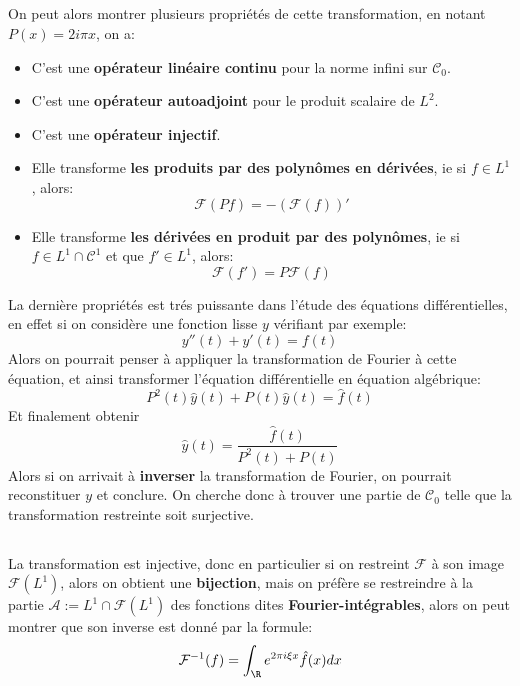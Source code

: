 \subsection*{}
On peut alors montrer plusieurs propriétés de cette transformation, en notant \( P(x) =  2i\pi x\), on a:
\begin{itemize}
   \item C'est une \textbf{opérateur linéaire continu} pour la norme infini sur \(  \mathcal{C}_0 \).
   \item C'est une \textbf{opérateur autoadjoint} pour le produit scalaire de \( L^2 \).
   \item C'est une \textbf{opérateur injectif}.
   \item Elle transforme \textbf{les produits par des polynômes en dérivées}, ie si \( f \in L^1\), alors:
   \[ 
      \mathcal{F}(Pf) = -(\mathcal{F}(f))'
   \]
   \item Elle transforme \textbf{les dérivées en produit par des polynômes}, ie si \( f \in L^1 \cap \mathcal{C}^1 \) et que \( f' \in L^1 \), alors:
   \[ 
      \mathcal{F}(f') = P\mathcal{F}(f) 
   \]
\end{itemize}
La dernière propriétés est trés puissante dans l'étude des équations différentielles, en effet si on considère une fonction lisse \( y \) vérifiant par exemple:
\[ 
   y''(t) + y'(t) =  f(t)
\]
Alors on pourrait penser à appliquer la transformation de Fourier à cette équation, et ainsi transformer l'équation différentielle en équation algébrique:
\[ 
   P^2(t)\hat{y}(t) + P(t)\hat{y}(t) = \hat{f}(t) 
\]
Et finalement obtenir
\[ 
   \hat{y}(t) = \frac{\hat{f}(t)}{P^2(t) + P(t)}
\]
Alors si on arrivait à \textbf{inverser} la transformation de Fourier, on pourrait reconstituer \( y \) et conclure. On cherche donc à trouver une partie de \( \mathcal{C}_0 \) telle que la transformation restreinte soit surjective.

\subsection*{}
La transformation est injective, donc en particulier si on restreint \( \mathcal{F} \) à son image \( \mathcal{F}(L^1) \), alors on obtient une \textbf{bijection}, mais on préfère se restreindre à la partie \( \mathscr{A} := L^1 \cap \mathcal{F}(L^1) \) des fonctions dites \textbf{Fourier-intégrables}, alors on peut montrer que son inverse est donné par la formule:
\[ 
   \mathcal{F}^{-1}(f) = \int_\R e^{2 \pi i \xi x} \hat{f}(x) dx
\]


